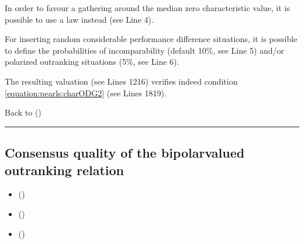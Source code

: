 \documentclass[a4paper,12pt,english]{sphinxhowto}
\begin{document}
\sphinxAtStartPar
In order to favour a gathering around the median zero characteristic value, it is possible to use a  law instead (see Line 4).

\sphinxAtStartPar
For inserting random considerable performance difference situations, it is possible to define the probabilities of incomparability (default 10\%, see Line 5) and/or polarized outranking situations (5\%, see Line 6).

\sphinxAtStartPar
The resulting valuation (see Lines 12\sphinxhyphen{}16) verifies indeed condition \eqref{equation:pearls:charODG2} (see Lines 18\sphinxhyphen{}19).

\sphinxAtStartPar
Back to {\hyperref[\detokenize{pearls:pearls-label}]{}} ()


\bigskip\hrule\bigskip



\subsection{Consensus quality of the bipolar\sphinxhyphen{}valued outranking relation}
\label{\detokenize{pearls:consensus-quality-of-the-bipolar-valued-outranking-relation}}\label{\detokenize{pearls:outranking-consensus-tutorial-label}}
\begin{sphinxcontents}
\begin{itemize}
\item {} 
\sphinxAtStartPar
{}\label{\detokenize{pearls:id166}}{\hyperref[\detokenize{pearls:circular-performance-tableaux}]{}} ()

\item {} 
\sphinxAtStartPar
{}\label{\detokenize{pearls:id167}}{\hyperref[\detokenize{pearls:a-difficult-decision-problem}]{}} ()

\item {} 
\sphinxAtStartPar
{}\label{\detokenize{pearls:id168}}{\hyperref[\detokenize{pearls:the-central-condorcet-point-of-view}]{}} ()

\end{itemize}
\end{sphinxcontents}
\end{document}
